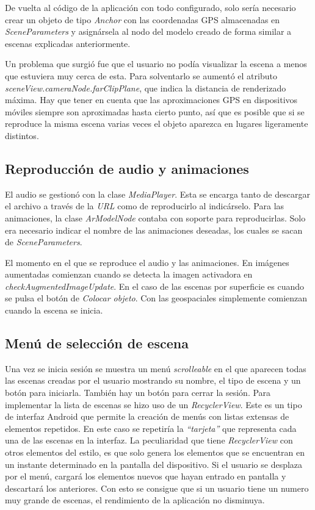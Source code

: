 De vuelta al código de la aplicación con todo configurado, solo sería necesario crear un objeto de tipo \textit{Anchor} con las coordenadas GPS almacenadas en \textit{SceneParameters} y asignársela al nodo del modelo creado de forma similar a escenas explicadas anteriormente.

Un problema que surgió fue que el usuario no podía visualizar la escena a menos que estuviera muy cerca de esta. Para solventarlo se aumentó el atributo \textit{sceneView.cameraNode.farClipPlane}, que indica la distancia de renderizado máxima. Hay que tener en cuenta que las aproximaciones GPS en dispositivos móviles siempre son aproximadas hasta cierto punto, así que es posible que si se reproduce la misma escena varias veces el objeto aparezca en lugares ligeramente distintos. 

\subsection{Reproducción de audio y animaciones}

El audio se gestionó con la clase \textit{MediaPlayer}. Esta se encarga tanto de descargar el archivo a través de la \textit{URL} como de reproducirlo al indicárselo. Para las animaciones, la clase \textit{ArModelNode} contaba con soporte para reproducirlas. Solo era necesario indicar el nombre de las animaciones deseadas, los cuales se sacan de \textit{SceneParameters}.

El momento en el que se reproduce el audio y las animaciones. En imágenes aumentadas comienzan cuando se detecta la imagen activadora en \textit{checkAugmentedImageUpdate}. En el caso de las escenas por superficie es cuando se pulsa el botón de \textit{Colocar objeto}. Con las geospaciales simplemente comienzan cuando la escena se inicia.

\subsection{Menú de selección de escena}

Una vez se inicia sesión se muestra un menú \textit{scrolleable} en el que aparecen todas las escenas creadas por el usuario mostrando su nombre, el tipo de escena y un botón para iniciarla. También hay un botón para cerrar la sesión. Para implementar la lista de escenas se hizo uso de un \textit{RecyclerView}. Este es un tipo de interfaz Android que permite la creación de menús con listas extensas de elementos repetidos. En este caso se repetiría la \textit{``tarjeta''} que representa cada una de las escenas en la interfaz. La peculiaridad que tiene \textit{RecyclerView} con otros elementos del estilo, es que solo genera los elementos que se encuentran en un instante determinado en la pantalla del dispositivo. Si el usuario se desplaza por el menú, cargará los elementos nuevos que hayan entrado en pantalla y descartará los anteriores. Con esto se consigue que si un usuario tiene un numero muy grande de escenas, el rendimiento de la aplicación no disminuya.

